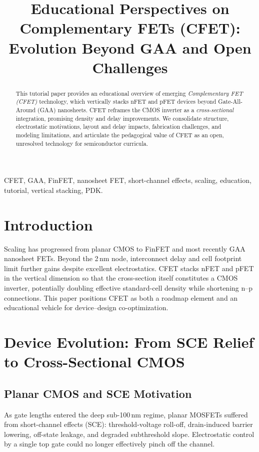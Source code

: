 \documentclass[conference]{IEEEtran}
\title{Educational Perspectives on Complementary FETs (CFET):\\
Evolution Beyond GAA and Open Challenges}
\author{
\IEEEauthorblockN{Shinichi Samizo}
\IEEEauthorblockA{Independent Semiconductor Researcher\\
Project Design Hub, Samizo-AITL\\
\textit{Email:} \href{mailto:shin3t72@gmail.com}{shin3t72@gmail.com}\quad
\textit{GitHub:} \href{https://github.com/Samizo-AITL}{Samizo-AITL}}
}
\begin{document}
\maketitle

\begin{abstract}
This tutorial paper provides an educational overview of emerging
\emph{Complementary FET (CFET)} technology, which vertically stacks nFET and pFET devices beyond Gate-All-Around (GAA) nanosheets.
CFET reframes the CMOS inverter as a \emph{cross-sectional} integration, promising density and delay improvements.
We consolidate structure, electrostatic motivations, layout and delay impacts, fabrication challenges, and modeling limitations, and articulate the pedagogical value of CFET as an open, unresolved technology for semiconductor curricula.
\end{abstract}

\begin{IEEEkeywords}
CFET, GAA, FinFET, nanosheet FET, short-channel effects, scaling, education, tutorial, vertical stacking, PDK.
\end{IEEEkeywords}

\section{Introduction}
Scaling has progressed from planar CMOS to FinFET and most recently GAA nanosheet FETs.
Beyond the 2\,nm node, interconnect delay and cell footprint limit further gains despite excellent electrostatics.
CFET stacks nFET and pFET in the vertical dimension so that the cross-section itself constitutes a CMOS inverter, potentially doubling effective standard-cell density while shortening n--p connections.
This paper positions CFET as both a roadmap element and an educational vehicle for device--design co-optimization.

\section{Device Evolution: From SCE Relief to Cross-Sectional CMOS}
\subsection{Planar CMOS and SCE Motivation}
As gate lengths entered the deep sub-100\,nm regime, planar MOSFETs suffered from short-channel effects (SCE): threshold-voltage roll-off, drain-induced barrier lowering, off-state leakage, and degraded subthreshold slope.
Electrostatic control by a single top gate could no longer effectively pinch off the channel.
\end{document}
